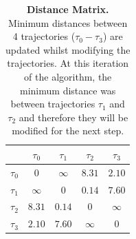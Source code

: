 \begin{table}[t]
	\centering
	\caption{\textbf{Distance Matrix.} Minimum distances between 4 trajectories ($\tau_0 - \tau_3$) are updated whilst modifying the trajectories.
	At this iteration of the algorithm, the minimum distance was between trajectories $\tau_1$ and $\tau_2$ and therefore they will be modified for the next step.}
	\begin{tabular}{|c||cccc|}
		\hline
		 			& $\tau_0$		& $\tau_1$ 		& $\tau_2$	& $\tau_3$	\\
		 \hline \hline
		$\tau_0$	& $0$			&	$\infty$ 	& $8.31$	& $2.10$	\\
		$\tau_1$	& $\infty$		&	$0$			& \cellcolor[gray]{0.9} $\mathbf{0.14}$	& $7.60$	\\
		$\tau_2$	& $8.31$		&	\cellcolor[gray]{0.9}$\mathbf{0.14}$ 		& $0$		& $\infty$	\\
		$\tau_3$	& $2.10$		&	$7.60$ 		& $\infty$	& $0$		\\
		\hline
		\end{tabular}
\label{tab:minimum-distances}
\end{table}






% 
% 

